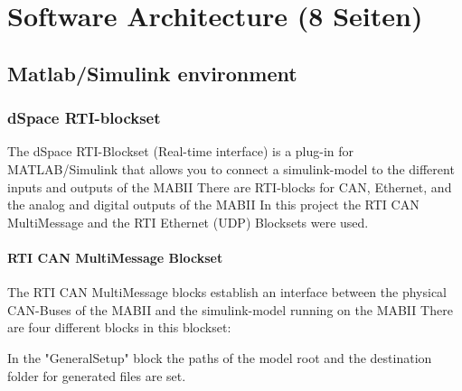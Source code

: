 \documentclass[ExampleMasters.tex]{subfiles}
\begin{document}
\clearpage


\chapter{Software Architecture (8 Seiten)}
\label{chap:software_setup}


\section{Matlab/Simulink environment}
\label{sec:matlab}




\subsection{dSpace RTI-blockset}
\label{dSpace_RTI}
The dSpace RTI-Blockset (Real-time interface) is a plug-in for MATLAB/Simulink that allows you to connect a simulink-model to the different inputs and outputs of the \gls{MABII} There are \gls{RTI}-blocks for CAN, Ethernet, and the analog and digital outputs of the \gls{MABII}
In this project the \gls{RTI} \gls{CAN} MultiMessage and the \gls{RTI} Ethernet (UDP) Blocksets were used.\\ 
\subsubsection{RTI \gls{CAN} MultiMessage Blockset}
The \gls{RTI} \gls{CAN} MultiMessage blocks establish an interface between the physical \gls{CAN}-Buses of the \gls{MABII} and the simulink-model running on the \gls{MABII} There are four different blocks in this blockset: 

In the "GeneralSetup" block the paths of the model root and the destination folder for generated files are set. 
\end{document}
